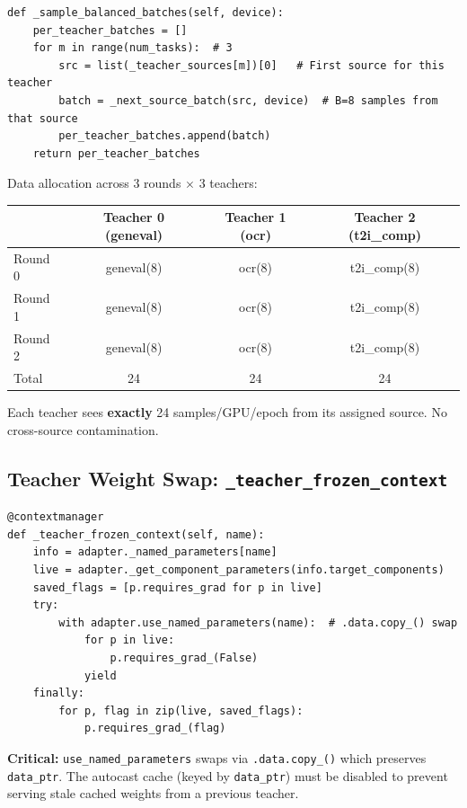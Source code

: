 \documentclass[11pt]{article}
\begin{document}
\begin{lstlisting}
def _sample_balanced_batches(self, device):
    per_teacher_batches = []
    for m in range(num_tasks):  # 3
        src = list(_teacher_sources[m])[0]   # First source for this teacher
        batch = _next_source_batch(src, device)  # B=8 samples from that source
        per_teacher_batches.append(batch)
    return per_teacher_batches
\end{lstlisting}

Data allocation across 3 rounds $\times$ 3 teachers:
\begin{center}
\begin{tabular}{lccc}
\toprule
 & Teacher 0 (geneval) & Teacher 1 (ocr) & Teacher 2 (t2i\_comp) \\
\midrule
Round 0 & geneval(8) & ocr(8) & t2i\_comp(8) \\
Round 1 & geneval(8) & ocr(8) & t2i\_comp(8) \\
Round 2 & geneval(8) & ocr(8) & t2i\_comp(8) \\
\midrule
Total & 24 & 24 & 24 \\
\bottomrule
\end{tabular}
\end{center}

Each teacher sees \textbf{exactly} 24 samples/GPU/epoch from its assigned source. No cross-source contamination.

\subsection{Teacher Weight Swap: \texttt{\_teacher\_frozen\_context}}

\begin{lstlisting}
@contextmanager
def _teacher_frozen_context(self, name):
    info = adapter._named_parameters[name]
    live = adapter._get_component_parameters(info.target_components)
    saved_flags = [p.requires_grad for p in live]
    try:
        with adapter.use_named_parameters(name):  # .data.copy_() swap
            for p in live:
                p.requires_grad_(False)
            yield
    finally:
        for p, flag in zip(live, saved_flags):
            p.requires_grad_(flag)
\end{lstlisting}

\textbf{Critical:} \texttt{use\_named\_parameters} swaps via \texttt{.data.copy\_()} which preserves \texttt{data\_ptr}. The autocast cache (keyed by \texttt{data\_ptr}) must be disabled to prevent serving stale cached weights from a previous teacher.
\end{document}
